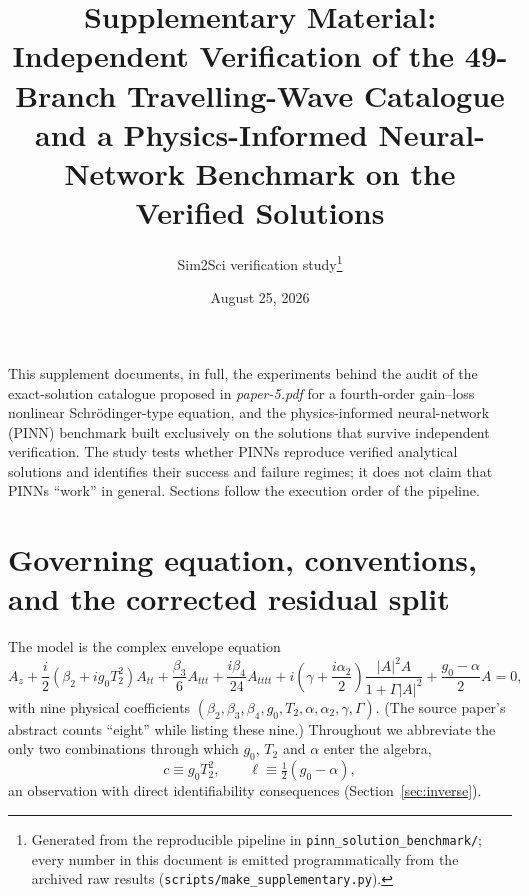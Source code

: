\documentclass[11pt,a4paper]{article}
\title{\bfseries Supplementary Material:\\
Independent Verification of the 49-Branch Travelling-Wave Catalogue and a
Physics-Informed Neural-Network Benchmark on the Verified Solutions}
\author{Sim2Sci verification study\thanks{Generated from the reproducible
pipeline in \texttt{pinn\_solution\_benchmark/}; every number in this document
is emitted programmatically from the archived raw results
(\texttt{scripts/make\_supplementary.py}).}}
\date{August 25, 2026}
\begin{document}
\maketitle

\noindent This supplement documents, in full, the experiments behind the audit
of the exact-solution catalogue proposed in \emph{paper-5.pdf} for a
fourth-order gain--loss nonlinear Schr\"odinger-type equation, and the
physics-informed neural-network (PINN) benchmark built exclusively on the
solutions that survive independent verification. The study tests whether PINNs
reproduce verified analytical solutions and identifies their success and
failure regimes; it does not claim that PINNs ``work'' in general. Sections
follow the execution order of the pipeline.

\tableofcontents

\section{Governing equation, conventions, and the corrected residual split}
\label{sec:eq}

The model is the complex envelope equation
\begin{equation}
\label{eq:pde}
A_z+\frac{i}{2}\left(\beta_2+i g_0T_2^2\right)A_{tt}
+\frac{\beta_3}{6}A_{ttt}
+\frac{i\beta_4}{24}A_{tttt}
+i\left(\gamma+\frac{i\alpha_2}{2}\right)\frac{|A|^2A}{1+\Gamma|A|^2}
+\frac{g_0-\alpha}{2}A=0 ,
\end{equation}
with nine physical coefficients
$(\beta_2,\beta_3,\beta_4,g_0,T_2,\alpha,\alpha_2,\gamma,\Gamma)$. (The source
paper's abstract counts ``eight'' while listing these nine.) Throughout we
abbreviate the only two combinations through which $g_0$, $T_2$ and $\alpha$
enter the algebra,
\begin{equation}
c \equiv g_0T_2^2, \qquad \ell \equiv \tfrac{1}{2}(g_0-\alpha),
\end{equation}
an observation with direct identifiability consequences
(Section~\ref{sec:inverse}).
\end{document}
